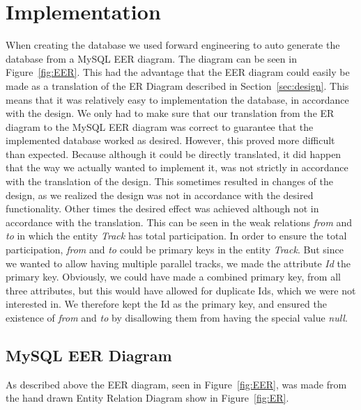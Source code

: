 \section{Implementation} \label{sec:implementation}

When creating the database we used forward engineering to auto generate the 
database from a MySQL EER diagram. The diagram can be seen in 
Figure~\ref{fig:EER}. This had the advantage that the EER diagram could easily 
be made as a translation of the ER Diagram described in 
Section~\ref{sec:design}. This means that it was relatively easy to 
implementation the database, in accordance with the design. We only had to make 
sure that our translation from the ER diagram to the MySQL EER diagram was 
correct to guarantee that the implemented database worked as desired. However, 
this proved more difficult than expected. Because although it could be directly 
translated, it did happen that the way we actually wanted to implement it, was 
not strictly in accordance with the translation of the design. This sometimes 
resulted in changes of the design, as we realized the design was not in 
accordance with the desired functionality. Other times the desired effect was 
achieved although not in accordance with the translation. This can be seen in 
the weak relations \emph{from} and \emph{to} in which the entity \emph{Track} 
has total participation. In order to ensure the total participation, 
\emph{from} and \emph{to} could be primary keys in the entity \emph{Track}. But 
since we wanted to allow having multiple parallel tracks, we made the attribute 
\emph{Id} the primary key. Obviously, we could have made a combined primary 
key, from all three attributes, but this would have allowed for duplicate Ids, 
which we were not interested in. We therefore kept the Id as the primary key, 
and ensured the existence of \emph{from} and \emph{to} by disallowing them from 
having the special value \emph{null}.

\subsection{MySQL EER Diagram}

As described above the EER diagram, seen in Figure~\ref{fig:EER}, was made from 
the hand drawn Entity Relation Diagram show in Figure~\ref{fig:ER}.


